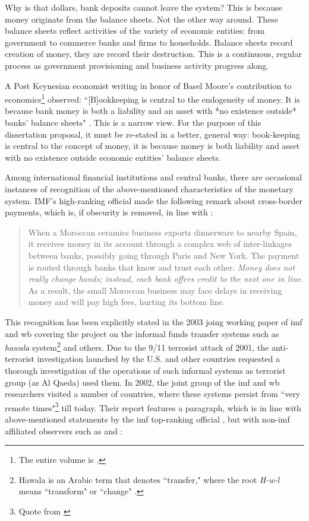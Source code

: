 Why is that dollars, bank deposits cannot leave the system? This is because money originate from the balance sheets. Not the other way around. These balance sheets reflect activities of the variety of economic entities: from government to commerce banks and firms to households. Balance sheets record creation of money, they are record their destruction. This is a continuous, regular process as government provisioning and business activity progress along.

A Post Keynesian economist writing in honor of Basel Moore's contribution to economics\footnote{The entire volume is \citep{moore2006}.} observed: ``[B]ookkeeping is central to the endogeneity of money. It is because bank money is both a liability and an asset with *no existence outside* banks' balance sheets" \citep[p.~21, emphasis added]{gnos2006}. This is a narrow view. For the purpose of this dissertation proposal, it must be re-stated in a better, general way: book-keeping is central to the concept of money, it is because money is both liability and asset with no existence outside economic entities' balance sheets.

Among international financial institutions and central banks, there are occasional instances of recognition of the above-mentioned characteristics of the monetary system. IMF's high-ranking official made the following remark about cross-border payments, which is, if obscurity is removed, in line with \citep{payoff2021}:

\begin{quote}
When a Moroccan ceramics business exports dinnerware to nearby Spain, it receives money in its account through a complex web of inter-linkages between banks, possibly going through Paris and New York. The payment is routed through banks that know and trust each other. \textit{Money does not really change hands; instead, each bank offers credit to the next one in line}. As a result, the small Moroccan business may face delays in receiving money and will pay high fees, hurting its bottom line. \citep[emphasis added]{adrian2023}
\end{quote}

This recognition has been explicitly stated in the 2003 joing working paper of \ac{imf} and \ac{wb} covering the project on the informal funds transfer systems such as \textit{hawala} system\footnote{Hawala is an Arabic term that denotes ``transfer," where the root
\textit{H-w-l} means ``transform" or ``change"  \citep[p.~328]{redin2014}.} and others. Due to the 9/11 terrosist attack of 2001, the anti-terrorist investigation launched by the U.S. and other countries requested a thorough investigation of the operations of such informal systems as terrorist group (as Al Qaeda) used them. In 2002, the joint group of the \ac{imf} and \ac{wb} researchers visited a number of countries, where these systems persist from ``very remote times"\footnote{Quote from \cite[p.~11]{imf2003}} till today. Their report features a paragraph, which is in line with above-mentioned statements by the \ac{imf} top-ranking official \cite{adrian2023}, but with non-\ac{imf} affiliated observers such as \cite{woodruff2005} and \cite{mosler2010,mosler2022,mosler2023}:


